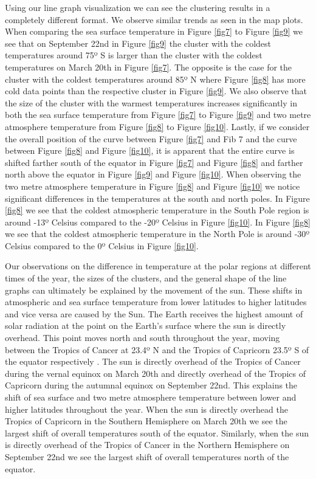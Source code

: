 \documentclass[conference,compsoc]{IEEEtran}
\begin{document}
Using our line graph visualization we can see the clustering results in a completely different format. We observe similar trends as seen in the map plots. When comparing the sea surface temperature in Figure \ref{fig7} to Figure \ref{fig9} we see that on September 22nd in Figure \ref{fig9} the cluster with the coldest temperatures around 75º S is larger than the cluster with the coldest temperatures on March 20th in Figure \ref{fig7}. The opposite is the case for the cluster with the coldest temperatures around 85º N where Figure \ref{fig8} has more cold data points than the respective cluster in Figure \ref{fig9}. We also observe that the size of the cluster with the warmest temperatures increases significantly in both the sea surface temperature from Figure \ref{fig7} to Figure \ref{fig9} and two metre atmosphere temperature from Figure \ref{fig8} to Figure \ref{fig10}. Lastly, if we consider the overall position of the curve between Figure \ref{fig7} and Fib 7 and the curve between Figure \ref{fig8} and Figure \ref{fig10}, it is apparent that the entire curve is shifted farther south of the equator in Figure \ref{fig7} and Figure \ref{fig8} and farther north above the equator in Figure \ref{fig9} and Figure \ref{fig10}. When observing the two metre atmosphere temperature in Figure \ref{fig8} and Figure \ref{fig10} we notice significant differences in the temperatures at the south and north poles. In Figure \ref{fig8} we see that the coldest atmospheric temperature in the South Pole region is around -13º Celsius compared to the -20º Celsius in Figure \ref{fig10}. In Figure \ref{fig8} we see that the coldest atmospheric temperature in the North Pole is around -30º Celsius compared to the 0º Celsius in Figure \ref{fig10}.

Our observations on the difference in temperature at the polar regions at different times of the year, the sizes of the clusters, and the general shape of the line graphs can ultimately be explained by the movement of the sun. These shifts in atmospheric and sea surface temperature from lower latitudes to higher latitudes and vice versa are caused by the Sun. The Earth receives the highest amount of solar radiation at the point on the Earth's surface where the sun is directly overhead. This point moves north and south throughout the year, moving between the Tropics of Cancer at 23.4º N and the Tropics of Capricorn 23.5º S of the equator respectively \cite{b8}. The sun is directly overhead of the Tropics of Cancer during the vernal equinox on March 20th and directly overhead of the Tropics of Capricorn during the autumnal equinox on September 22nd. This explains the shift of sea surface and two metre atmosphere temperature between lower and higher latitudes throughout the year. When the sun is directly overhead the Tropics of Capricorn in the Southern Hemisphere on March 20th we see the largest shift of overall temperatures south of the equator. Similarly, when the sun is directly overhead of the Tropics of Cancer in the Northern Hemisphere on September 22nd we see the largest shift of overall temperatures north of the equator.
\end{document}
